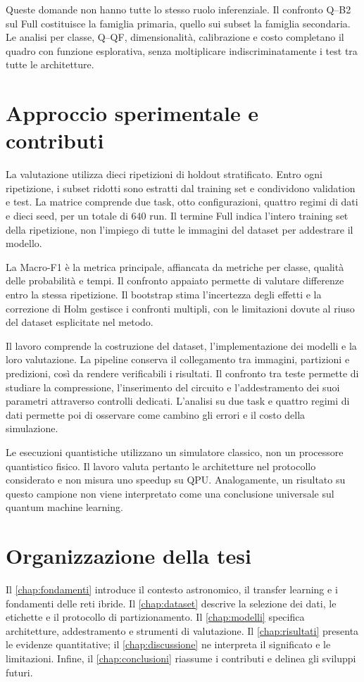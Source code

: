 Queste domande non hanno tutte lo stesso ruolo inferenziale. Il confronto
Q--B2 sul Full costituisce la famiglia primaria, quello sui subset la
famiglia secondaria. Le analisi per classe, Q--QF, dimensionalità,
calibrazione e costo completano il quadro con funzione esplorativa,
senza moltiplicare indiscriminatamente i test tra tutte le architetture.

\section{Approccio sperimentale e contributi}
\label{sec:intro-contributi}

La valutazione utilizza dieci ripetizioni di holdout stratificato.
Entro ogni ripetizione, i subset ridotti sono estratti dal training
set e condividono validation e test. La matrice comprende due task,
otto configurazioni, quattro regimi di dati e dieci seed, per un
totale di \(640\) run. Il termine Full indica l'intero training
set della ripetizione, non l'impiego di tutte le immagini del dataset
per addestrare il modello.

La Macro-F1 è la metrica principale, affiancata da metriche per classe,
qualità delle probabilità e tempi. Il confronto appaiato permette di
valutare differenze entro la stessa ripetizione. Il bootstrap stima
l'incertezza degli effetti e la correzione di Holm gestisce i confronti multipli,
con le limitazioni dovute al riuso del dataset esplicitate nel metodo.

Il lavoro comprende la costruzione del dataset, l'implementazione
dei modelli e la loro valutazione. La pipeline conserva il collegamento
tra immagini, partizioni e predizioni, così da rendere verificabili
i risultati. Il confronto tra teste permette di studiare la
compressione, l'inserimento del circuito e l'addestramento dei suoi
parametri attraverso controlli dedicati. L'analisi su due task e quattro
regimi di dati permette
poi di osservare come cambino gli errori e il costo della simulazione.

Le esecuzioni quantistiche utilizzano un simulatore classico, non un
processore quantistico fisico. Il lavoro valuta pertanto le architetture
nel protocollo considerato e non misura uno speedup su QPU. Analogamente,
un risultato su questo campione non viene interpretato come una
conclusione universale sul quantum machine learning.

\section{Organizzazione della tesi}

Il \cref{chap:fondamenti} introduce il contesto astronomico, il transfer
learning e i fondamenti delle reti ibride. Il \cref{chap:dataset}
descrive la selezione dei dati, le etichette e il protocollo di
partizionamento. Il \cref{chap:modelli} specifica architetture,
addestramento e strumenti di valutazione. Il \cref{chap:risultati}
presenta le evidenze quantitative; il \cref{chap:discussione} ne
interpreta il significato e le limitazioni. Infine, il
\cref{chap:conclusioni} riassume i contributi e delinea gli sviluppi
futuri.
